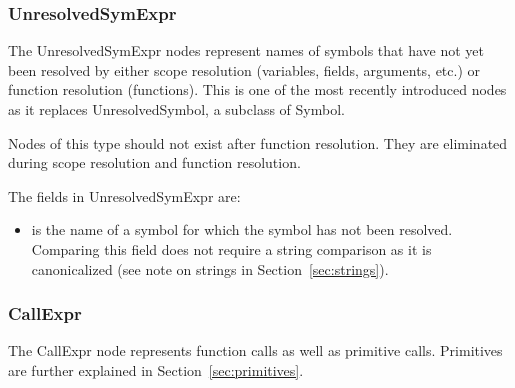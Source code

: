 \documentclass[10pt]{article}
\begin{document}
\subsubsection{UnresolvedSymExpr}
\label{sec:unresolvedsymexpr}

The UnresolvedSymExpr nodes represent names of symbols that have not
yet been resolved by either scope resolution (variables, fields,
arguments, etc.) or function resolution (functions).  This is one of
the most recently introduced nodes as it replaces UnresolvedSymbol, a
subclass of Symbol.

Nodes of this type should not exist after function resolution.  They
are eliminated during scope resolution and function resolution.

The fields in UnresolvedSymExpr are:
\begin{itemize}
\item {} is the name of a symbol for which
  the symbol has not been resolved.  Comparing this field does not
  require a string comparison as it is canonicalized (see note on
  strings in Section~\ref{sec:strings}).
\end{itemize}

\subsubsection{CallExpr}
\label{sec:callexpr}

The CallExpr node represents function calls as well as primitive
calls.  Primitives are further explained in
Section~\ref{sec:primitives}.
\end{document}
